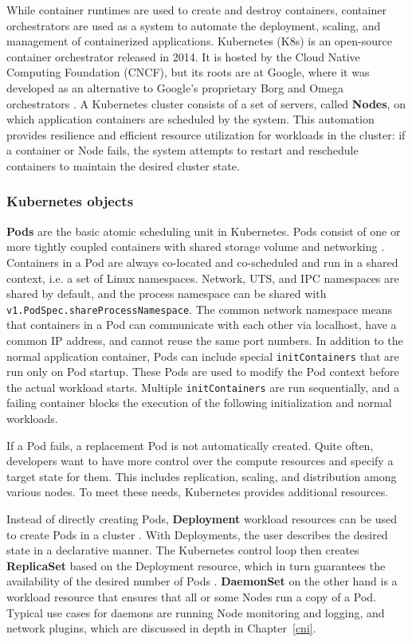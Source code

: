 \documentclass[english, 12pt, a4paper, sci, utf8, a-2b, online]{aaltothesis}
\begin{document}
While container runtimes are used to create and destroy containers, container orchestrators are used as a system to automate the deployment, scaling, and management of containerized applications.
Kubernetes (K8s) \cite{kubernetes} is an open-source container orchestrator released in 2014.
It is hosted by the Cloud Native Computing Foundation (CNCF), but its roots are at Google, where it was developed as an alternative to Google's proprietary Borg and Omega orchestrators \cite{burns2016borg}.
A Kubernetes cluster consists of a set of servers, called \textbf{Nodes}, on which application containers are scheduled by the system.
This automation provides resilience and efficient resource utilization for workloads in the cluster: if a container or Node fails, the system attempts to restart and reschedule containers to maintain the desired cluster state.

\subsubsection{Kubernetes objects}

\textbf{Pods} are the basic atomic scheduling unit in Kubernetes.
Pods consist of one or more tightly coupled containers with shared storage volume and networking \cite{k8s-docs-pods}.
Containers in a Pod are always co-located and co-scheduled and run in a shared context, i.e. a set of Linux namespaces.
Network, UTS, and IPC namespaces are shared by default, and the process namespace can be shared with \lstinline{v1.PodSpec.shareProcessNamespace}.
The common network namespace means that containers in a Pod can communicate with each other via localhost, have a common IP address, and cannot reuse the same port numbers.
In addition to the normal application container, Pods can include special \lstinline{initContainers} that are run only on Pod startup.
These Pods are used to modify the Pod context before the actual workload starts.
Multiple \lstinline{initContainers} are run sequentially, and a failing container blocks the execution of the following initialization and normal workloads.

If a Pod fails, a replacement Pod is not automatically created.
Quite often, developers want to have more control over the compute resources and specify a target state for them.
This includes replication, scaling, and distribution among various nodes.
To meet these needs, Kubernetes provides additional resources.

Instead of directly creating Pods, \textbf{Deployment} workload resources can be used to create Pods in a cluster \cite{k8s-docs-pods}.
With Deployments, the user describes the desired state in a declarative manner.
The Kubernetes control loop then creates \textbf{ReplicaSet} based on the Deployment resource, which in turn guarantees the availability of the desired number of Pods \cite{k8s-docs-deployment}.
\textbf{DaemonSet} on the other hand is a workload resource that ensures that all or some Nodes run a copy of a Pod.
Typical use cases for daemons are running Node monitoring and logging, and network plugins, which are discussed in depth in Chapter~\ref{cni}.
\end{document}
